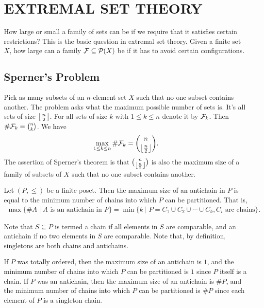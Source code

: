 \chapter{EXTREMAL SET THEORY}

How large or small a family of sets can be if we require that it satisfies certain restrictions? This is the basic question in extremal set theory. Given a finite set $X$, how large can a family $\mathcal{F} \subseteq \mathcal{P}(X)$ be if it has to avoid certain configurations.

\section{Sperner's Problem}
Pick as many subsets of an $n$-element set $X$ such that no one subset contains another. The problem asks what the maximum possible number of sets is. It's all sets of size $\left\lfloor \frac{n}{2} \right\rfloor$. For all sets of size $k$ with $1 \leq k \leq n$ denote it by $\mathcal{F}_{k}$. Then $\# \mathcal{F}_{k} = \binom{n}{k}$. We have
\begin{align}
    \max_{1 \leq k \leq n} \# \mathcal{F}_{k} = \binom{n}{\left\lfloor \frac{n}{2} \right\rfloor}.
\end{align}
The assertion of Sperner's theorem is that $\binom{n}{\left\lfloor \frac{n}{2} \right\rfloor}$ is also the maximum size of a family of subsets of $X$ such that no one subset contains another.

\begin{theorem}
    Let $(P, \leq)$ be a finite poset. Then the maximum size of an antichain in $P$ is equal to the minimum number of chains into which $P$ can be partitioned. That is,
    \begin{align}
        \max \{\#A \mid A \text{ is an antichain in } P\} = \min \{k \mid P = C_{1} \cup C_{2} \cup \cdots \cup C_{k}, C_{i} \text{ are chains}\}.
    \end{align}
\end{theorem}
Note that $S \subseteq P$ is termed a chain if all elements in $S$ are comparable, and an antichain if no two elements in $S$ are comparable. Note that, by definition, singletons are both chains and antichains.

If $P$ was totally ordered, then the maximum size of an antichain is $1$, and the minimum number of chains into which $P$ can be partitioned is $1$ since $P$ itself is a chain. If $P$ was an antichain, then the maximum size of an antichain is $\#P$, and the minimum number of chains into which $P$ can be partitioned is $\#P$ since each element of $P$ is a singleton chain.


